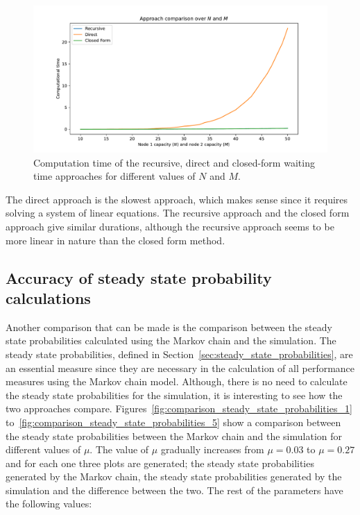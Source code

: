 \begin{figure}[H]
    \includegraphics[width=\textwidth]{chapters/03_queueing_model/Bin/numeric_results_and_timings/waiting_time_formulas_comparison/algorithm_duration_over_N_and_M.pdf}
    \caption{Computation time of the recursive, direct and closed-form waiting
    time approaches for different values of \(N\) and \(M\).}
    \label{fig:waiting_time_algorithm_duration_over_N_and_M}
\end{figure}

The direct approach is the slowest approach, which makes sense since it requires
solving a system of linear equations.
The recursive approach and the closed form approach give similar durations,
although the recursive approach seems to be more linear in nature than the
closed form method.


\subsection{Accuracy of steady state probability calculations}
\label{sec:accuracy_of_steady_state_probabilities}

Another comparison that can be made is the comparison between the steady state
probabilities calculated using the Markov chain and the simulation.
The steady state probabilities, defined in
Section~\ref{sec:steady_state_probabilities}, are an essential measure since
they are necessary in the calculation of all performance measures using the
Markov chain model.
Although, there is no need to calculate the steady state probabilities for the
simulation, it is interesting to see how the two approaches compare.
Figures~\ref{fig:comparison_steady_state_probabilities_1}
to~\ref{fig:comparison_steady_state_probabilities_5} show a comparison between
the steady state probabilities between the Markov chain and the simulation
for different values of \(\mu\).
The value of \(\mu\) gradually increases from \(\mu = 0.03\) to \(\mu = 0.27\)
and for each one three plots are generated; the steady state probabilities
generated by the Markov chain, the steady state probabilities generated by the
simulation and the difference between the two.
The rest of the parameters have the following values:

